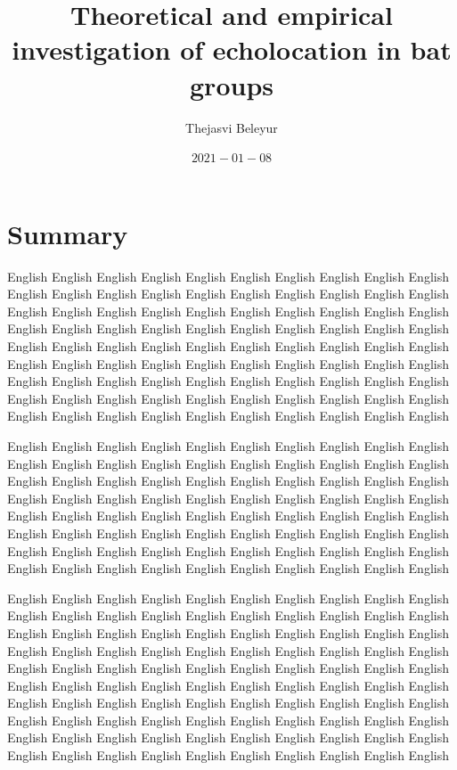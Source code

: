 \documentclass[
]{book}
\title{Theoretical and empirical investigation of echolocation in bat groups}
\author{Thejasvi Beleyur}
\date{\(2021-01-08\)}
\begin{document}
\maketitle

{
\setcounter{tocdepth}{1}
\tableofcontents
}
\hypertarget{summary}{%
\chapter*{Summary}\label{summary}}

English English English English English English English English English English English English English English English English English English English English English English English English English English English English English English English English English English English English English English English English English English English English English English English English English English English English English English English English English English English English English English English English English English English English English English English English English English English English English English English English English English English English English English English English English English

English English English English English English English English English English English English English English English English English English English English English English English English English English English English English English English English English English English English English English English English English English English English English English English English English English English English English English English English English English English English English English English English English English English English English English English English English English English English English English English English

English English English English English English English English English English English English English English English English English English English English English English English English English English English English English English English English English English English English English English English English English English English English English English English English English English English English English English English English English English English English English English English English English English English English English English English English English English English English English English English English English English English English English English English English English English
English English English English English English English English English English
\end{document}
